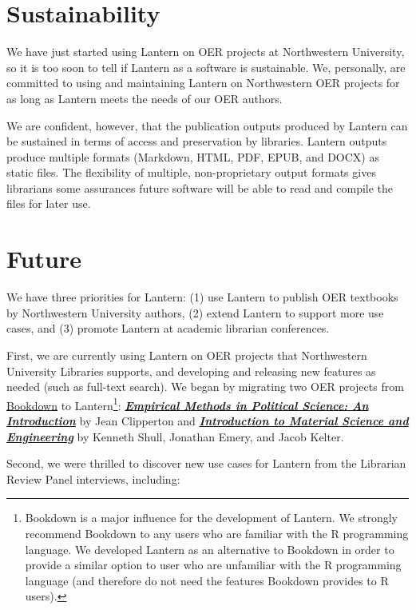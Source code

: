 \documentclass[
  11pt,
  openany]{book}
\begin{document}
\hypertarget{sustainability}{%
\section{Sustainability}\label{sustainability}}

We have just started using Lantern on OER projects at Northwestern University,
so it is too soon to tell if Lantern as a software is sustainable. We,
personally, are committed to using and maintaining Lantern on Northwestern OER
projects for as long as Lantern meets the needs of our OER authors.

We are confident, however, that the publication outputs produced by Lantern
can be sustained in terms of access and preservation by libraries. Lantern
outputs produce multiple formats (Markdown, HTML, PDF, EPUB, and DOCX) as
static files. The flexibility of multiple, non-proprietary output formats
gives librarians some assurances future software will be able to read and
compile the files for later use.

\hypertarget{future}{%
\section{Future}\label{future}}

We have three priorities for Lantern: (1) use Lantern to publish OER textbooks
by Northwestern University authors, (2) extend Lantern to support more use
cases, and (3) promote Lantern at academic librarian conferences.

First, we are currently using Lantern on OER projects that Northwestern
University Libraries supports, and developing and releasing new features as
needed (such as full-text search). We began by migrating two OER projects from
\href{https://bookdown.org/}{Bookdown} to Lantern\footnote{Bookdown is a major
  influence for the development of Lantern. We strongly recommend Bookdown to
  any users who are familiar with the R programming language. We developed
  Lantern as an alternative to Bookdown in order to provide a similar option
  to user who are unfamiliar with the R programming language (and therefore do
  not need the features Bookdown provides to R users).}:
\href{https://emps.northwestern.pub/}{\textbf{\emph{Empirical Methods in
Political Science: An Introduction}}} by Jean Clipperton and
\href{https://chrisdaaz.github.io/intro-to-mse/}{\textbf{\emph{Introduction to
Material Science and Engineering}}} by Kenneth Shull, Jonathan Emery, and
Jacob Kelter.

Second, we were thrilled to discover new use cases for Lantern from the
Librarian Review Panel interviews, including:
\end{document}
